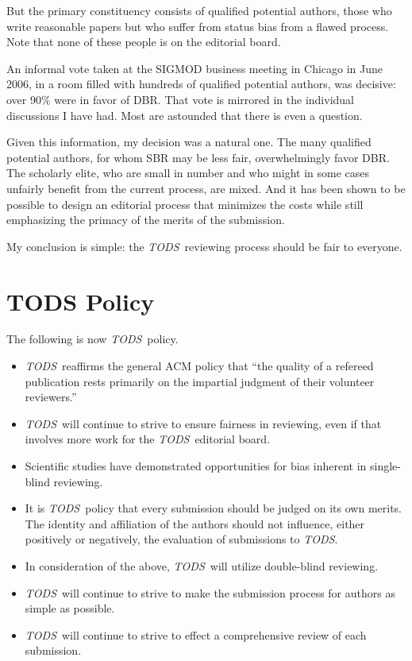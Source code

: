 \documentclass[acmtods,acmnow]{acmtrans2m}
\newcommand{\tods}{{\em TODS\/}}
\begin{document}
But the primary constituency consists of qualified potential authors,
those who write reasonable papers but who suffer from status bias from
a flawed process. Note that none of these people is on the editorial board.

An informal vote taken at the SIGMOD business meeting in Chicago in June
2006, in a room
filled with hundreds of qualified potential authors, was decisive: over 90\%
were in favor of DBR. That vote is mirrored in the individual
discussions I have had. Most are astounded that there is even a
question.

Given this information, my decision was a natural one. The many
qualified potential authors, for whom SBR may be less fair, overwhelmingly
favor DBR. The scholarly elite, who are small in number and who might in
some cases unfairly benefit from the current process, are mixed. And it has
been shown to be possible to design an editorial process that
minimizes the costs while still emphasizing the primacy of the merits of the
submission.

My conclusion is simple: the \tods\ reviewing process should be fair to
everyone.

\section{TODS Policy}

The following is now \tods\ policy.
\begin{itemize}
\item \tods\ reaffirms the general ACM policy that ``the quality of a refereed
  publication rests primarily on the impartial judgment of their volunteer
  reviewers.''

\item \tods\ will continue to strive to ensure fairness in reviewing, even if
  that involves more work for the \tods\ editorial board.

\item Scientific studies have demonstrated opportunities for bias inherent in
  single-blind reviewing.

\item It is \tods\ policy that every submission should be judged on its own
merits. The identity and affiliation of the authors should not influence,
  either positively or negatively, the evaluation of submissions to \tods.

\item In consideration of the above, \tods\ will utilize double-blind reviewing.

\item \tods\ will continue to strive to make the submission process for
  authors as simple as possible.

\item \tods\ will continue to strive to effect a comprehensive review of each
submission.
\end{itemize}
\end{document}
